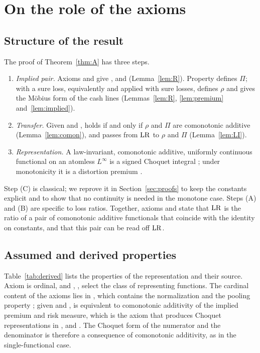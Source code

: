 \section{On the role of the axioms}\label{sec:triviality}

\subsection{Structure of the result}

The proof of Theorem~\ref{thm:A} has three steps.

\begin{enumerate}[label=(\Alph*),leftmargin=*,itemsep=2pt]
\item \emph{Implied pair.} Axioms \axPe{} and \axR{} give \axP, \axN{} and \axCM{} (Lemma~\ref{lem:R}). Property \axP{}
  defines $\Pi$; \axR{} with a sure loss, equivalently \axN{} and \axCM{} applied with sure losses, defines $\rho$ and
  gives the Möbius form of the cash lines (Lemmas~\ref{lem:R}, \ref{lem:premium} and~\ref{lem:implied}).
\item \emph{Transfer.} Given \axP{} and \axN, \axCM{} holds if and only if $\rho$ and $\Pi$ are comonotonic
  additive (Lemma~\ref{lem:comon}), and \axLI{} passes from $\mathrm{LR}$ to $\rho$ and $\Pi$ (Lemma~\ref{lem:LI}).
\item \emph{Representation.} A law-invariant, comonotonic additive, uniformly continuous functional on an
  atomless $L^\infty$ is a signed Choquet integral \citep[Thm.~1]{www2020}; under monotonicity it is a
  distortion premium \citep{schmeidler1986,wyp1997}.
\end{enumerate}

Step (C) is classical; we reprove it in Section~\ref{sec:proofs} to keep the constants explicit and to show that
no continuity is needed in the monotone case. Steps (A) and (B) are specific to loss ratios. Together, axioms
\axPe{} and \axR{} state that $\mathrm{LR}$ is the ratio of a pair of comonotonic additive functionals that coincide
with the identity on constants, and that this pair can be read off $\mathrm{LR}$.

\subsection{Assumed and derived properties}

Table~\ref{tab:derived} lists the properties of the representation and their source. Axiom \axPe{} is ordinal,
and \axLI, \axRC, \axRM{} select the class of representing functions. The cardinal content of the axioms lies in
\axR, which contains the normalization \axN{} and the pooling property \axCM; given \axP{} and \axN, \axCM{} is equivalent to
comonotonic additivity of the implied premium and risk measure, which is the axiom that produces Choquet
representations in \citet{yaari1987}, \citet{schmeidler1986} and \citet{wyp1997}. The Choquet form of the numerator
and the denominator is therefore a consequence of comonotonic additivity, as in the single-functional case.

